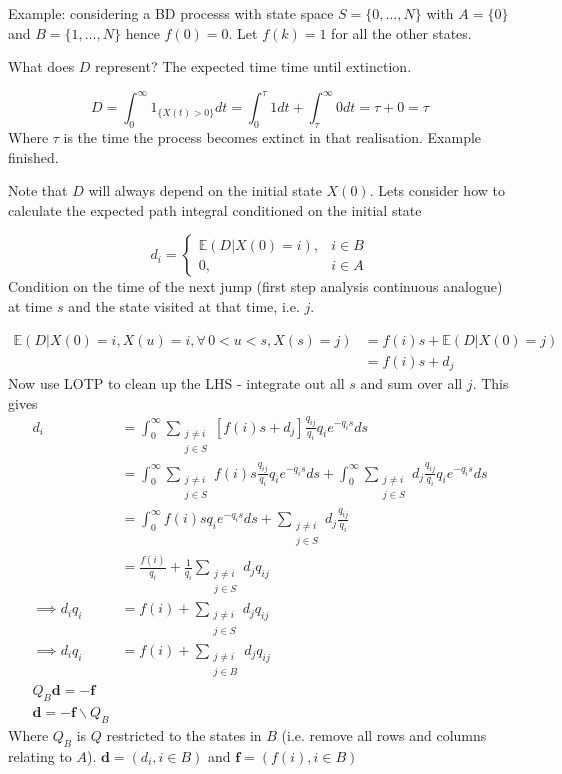 \documentclass{X:/Documents/Coding/Latex/myassignment}
\begin{document}
Example: considering a BD processs with state space $S = \{0,\ldots,N\}$ with $A = \{0\}$ and $B = \{1,\ldots,N\}$ hence $f(0) = 0$.
Let $f(k) = 1$ for all the other states.

What does $D$ represent? The expected time time until extinction.

\[D = \int_0^\infty 1_{\{X(t) >0\}} dt = \int_0^\tau 1 dt + \int_\tau^\infty 0 dt = \tau +0 =\tau\]
Where $\tau$ is the time the process becomes extinct in that realisation. Example finished.

Note that $D$ will always depend on the initial state $X(0)$.
Lets consider how to calculate the expected path integral conditioned on the initial state

\[d_i = \begin{cases}
        \mathbb{E}\left(D | X(0) = i\right), &i \in B\\
        0,&i \in A
    \end{cases}\]
Condition on the time of the next jump (first step analysis continuous analogue) at time $s$ and the state visited at that time, i.e. $j$.

\begin{align*}
\mathbb{E}\left(D | X(0) = i, X(u) = i, \forall\, 0<u<s, X(s) = j\right)&= f(i)s + \mathbb{E}(D|X(0)=j)\\
        &= f(i)s + d_j
\end{align*}
Now use LOTP to clean up the LHS - integrate out all $s$ and sum over all $j$. This gives
\begin{align*}
d_i &= \int_0^\infty\sum_{\substack{j\neq i\\j \in S}}\left[f(i)s + d_j\right]\frac{q_{ij}}{q_i}q_i e^{-q_i s} ds\\
&=\int_0^\infty\sum_{\substack{j\neq i\\j \in S}}f(i)s\frac{q_{ij}}{q_i}q_i e^{-q_i s} ds +\int_0^\infty\sum_{\substack{j\neq i\\j \in S}}d_j\frac{q_{ij}}{q_i}q_i e^{-q_i s} ds  \\
&=\int_0^\infty f(i)s q_i e^{-q_i s} ds +\sum_{\substack{j\neq i\\j \in S}}d_j\frac{q_{ij}}{q_i}\\
&=\frac{f(i)}{q_i} + \frac1{q_i} \sum_{\substack{j\neq i\\j \in S}} d_j q_{ij}\\
\implies d_iq_i &= f(i) +  \sum_{\substack{j\neq i\\j \in S}} d_j q_{ij}\\
\implies d_iq_i &= f(i) +  \sum_{\substack{j\neq i\\j \in B}} d_j q_{ij}\\
Q_B \mathbf{d} = - \mathbf{f}\\
\mathbf{d} = -\mathbf{f} \backslash Q_B
\end{align*}
Where $Q_B$ is $Q$ restricted to the states in $B$ (i.e. remove all rows and columns relating to $A$). $\mathbf{d} = (d_i,i\in B)$ and $\mathbf{f} = (f(i),i\in B)$
\end{document}
